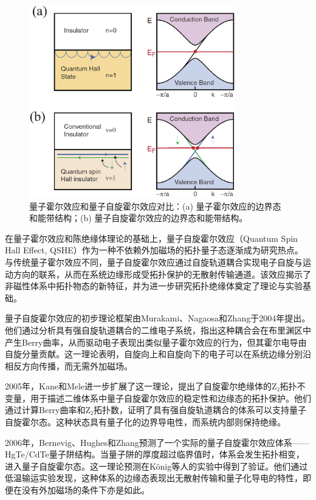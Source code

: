 \begin{figure}[h!]
    \centering
    \includegraphics[width=0.8\textwidth]{images/fig1-3.eps} 
    \caption{量子霍尔效应和量子自旋霍尔效应对比：(a) 量子霍尔效应的边界态和能带结构；(b) 量子自旋霍尔效应的边界态和能带结构。\cite{r11}}
    \label{fig_1_3}
\end{figure}

在量子霍尔效应和陈绝缘体理论的基础上，量子自旋霍尔效应（Quantum Spin Hall Effect, QSHE）作为一种不依赖外加磁场的拓扑量子态逐渐成为研究热点。与传统量子霍尔效应不同，量子自旋霍尔效应通过自旋轨道耦合实现电子自旋与运动方向的联系，从而在系统边缘形成受拓扑保护的无散射传输通道。该效应揭示了非磁性体系中拓扑物态的新特征，并为进一步研究拓扑绝缘体奠定了理论与实验基础。

量子自旋霍尔效应的初步理论框架由Murakami、Nagaosa和Zhang于2004年提出\cite{e1}。他们通过分析具有强自旋轨道耦合的二维电子系统，指出这种耦合会在布里渊区中产生Berry曲率，从而驱动电子表现出类似量子霍尔效应的行为，但其霍尔电导由自旋分量贡献。这一理论表明，自旋向上和自旋向下的电子可以在系统边缘分别沿相反方向传播，而无需外加磁场。

2005年，Kane和Mele进一步扩展了这一理论\cite{e2,e3}，提出了自旋霍尔绝缘体的Z₂拓扑不变量，用于描述二维体系中量子自旋霍尔效应的稳定性和边缘态的拓扑保护。他们通过计算Berry曲率和Z₂拓扑数，证明了具有强自旋轨道耦合的体系可以支持量子自旋霍尔态。这种状态具有量子化的边界导电性，而系统内部则保持绝缘。

2006年，Bernevig、Hughes和Zhang预测了一个实际的量子自旋霍尔效应体系——HgTe/CdTe量子阱结构\cite{e4}。当量子阱的厚度超过临界值时，体系会发生拓扑相变，进入量子自旋霍尔态。这一理论预测在König等人的实验中得到了验证\cite{e5}。他们通过低温输运实验发现，这种体系的边缘态表现出无散射传输和量子化导电的特性，即便在没有外加磁场的条件下亦是如此。

